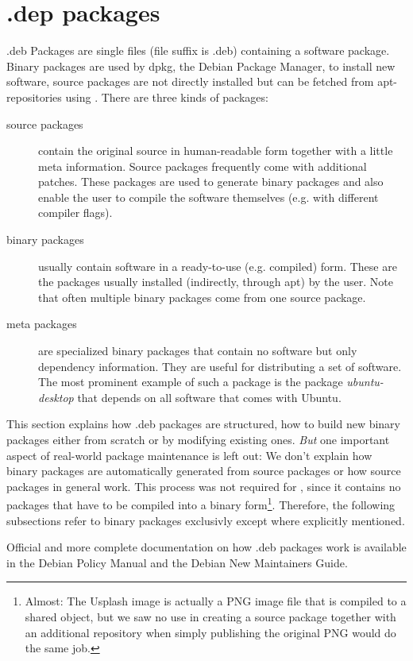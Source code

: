 \section{.dep packages}\label{chapter:deb packages}
.deb Packages are single files (file suffix is .deb) containing a software
package. Binary packages are used by dpkg, the Debian Package Manager, to
install new software, source packages are not directly installed but can be
fetched from apt-repositories using . 
There are three kinds of packages:
\begin{description}
  \item[source packages] contain the original source in human-readable form
    together with a little meta information. Source packages frequently come
    with additional patches. These packages are used to generate binary
    packages and also enable the user to compile the software themselves (e.g.
    with different compiler flags).
  \item[binary packages] usually contain software in a ready-to-use (e.g.
    compiled) form. These are the packages usually installed (indirectly,
    through apt) by the user. Note that often multiple binary packages come from
    one source package.
  \item[meta packages] are specialized binary packages that contain no software
    but only dependency information. They are useful for distributing a set of
    software. The most prominent example of such a package is the package
    \emph{ubuntu-desktop} that depends on all software that comes with Ubuntu.
\end{description}

This section explains how .deb packages are structured, how to build new
binary packages either from scratch or by modifying existing ones. \emph{But}
one important aspect of real-world package maintenance is left out: We don't
explain how binary packages are automatically generated from source packages or
how source packages in general work. This process was not required for \tunix,
since it contains no packages that have to be compiled into a binary
form\footnote{Almost: The \tunix Usplash image is actually a PNG image file that
is compiled to a shared object, but we saw no use in creating a source package
together with an additional repository when simply publishing the original PNG
would do the same job.}. Therefore, the following subsections refer to binary
packages exclusivly except where explicitly mentioned.

Official and more complete documentation on how .deb packages work is available 
in the Debian Policy Manual\cite{debian policy manual} and the Debian New
Maintainers Guide\cite{debian new maintainers guide}.

